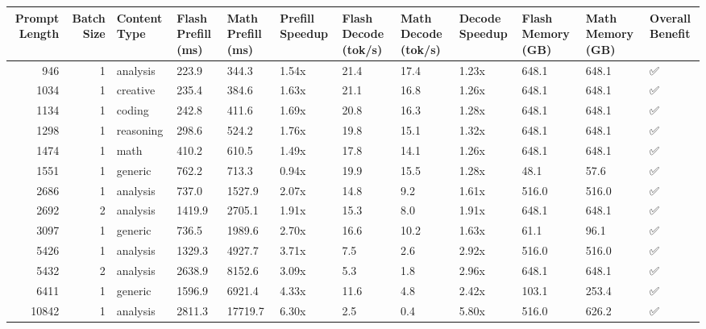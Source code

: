 \begin{tabular}{rrllllllllll}
\toprule
Prompt Length & Batch Size & Content Type & Flash Prefill (ms) & Math Prefill (ms) & Prefill Speedup & Flash Decode (tok/s) & Math Decode (tok/s) & Decode Speedup & Flash Memory (GB) & Math Memory (GB) & Overall Benefit \\
\midrule
946 & 1 & analysis & 223.9 & 344.3 & 1.54x & 21.4 & 17.4 & 1.23x & 648.1 & 648.1 & ✅ \\
1034 & 1 & creative & 235.4 & 384.6 & 1.63x & 21.1 & 16.8 & 1.26x & 648.1 & 648.1 & ✅ \\
1134 & 1 & coding & 242.8 & 411.6 & 1.69x & 20.8 & 16.3 & 1.28x & 648.1 & 648.1 & ✅ \\
1298 & 1 & reasoning & 298.6 & 524.2 & 1.76x & 19.8 & 15.1 & 1.32x & 648.1 & 648.1 & ✅ \\
1474 & 1 & math & 410.2 & 610.5 & 1.49x & 17.8 & 14.1 & 1.26x & 648.1 & 648.1 & ✅ \\
1551 & 1 & generic & 762.2 & 713.3 & 0.94x & 19.9 & 15.5 & 1.28x & 48.1 & 57.6 & ✅ \\
2686 & 1 & analysis & 737.0 & 1527.9 & 2.07x & 14.8 & 9.2 & 1.61x & 516.0 & 516.0 & ✅ \\
2692 & 2 & analysis & 1419.9 & 2705.1 & 1.91x & 15.3 & 8.0 & 1.91x & 648.1 & 648.1 & ✅ \\
3097 & 1 & generic & 736.5 & 1989.6 & 2.70x & 16.6 & 10.2 & 1.63x & 61.1 & 96.1 & ✅ \\
5426 & 1 & analysis & 1329.3 & 4927.7 & 3.71x & 7.5 & 2.6 & 2.92x & 516.0 & 516.0 & ✅ \\
5432 & 2 & analysis & 2638.9 & 8152.6 & 3.09x & 5.3 & 1.8 & 2.96x & 648.1 & 648.1 & ✅ \\
6411 & 1 & generic & 1596.9 & 6921.4 & 4.33x & 11.6 & 4.8 & 2.42x & 103.1 & 253.4 & ✅ \\
10842 & 1 & analysis & 2811.3 & 17719.7 & 6.30x & 2.5 & 0.4 & 5.80x & 516.0 & 626.2 & ✅ \\
\bottomrule
\end{tabular}

